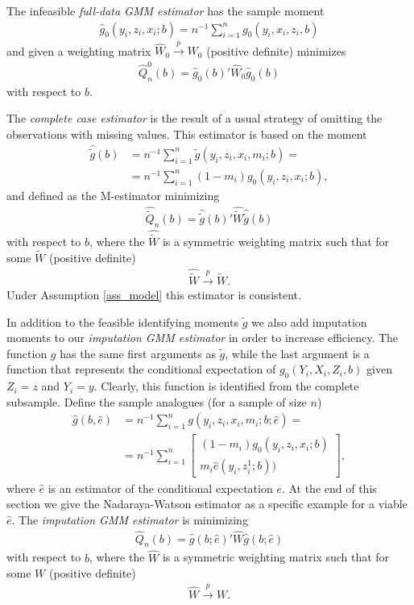\documentclass{article}
\theoremstyle{definition}
\theoremstyle{remark}
\begin{document}
The infeasible \emph{full-data GMM estimator} has the sample moment
\begin{align}
\hat{g}_0(y_i,z_i,x_i;b) = n^{-1}\sum_{i=1}^n g_0(y_i,x_i,z_i,b)
\end{align}
and given a weighting matrix $\hat{W}_0\stackrel{p}{\rightarrow} W_0$ (positive definite) minimizes
\begin{align}
\hat{Q}^0_n(b)= \hat{g}_0(b)'\hat{W}_0\hat{g}_0(b)
\end{align}
with respect to $b$.

The \textit{complete case estimator} is the result of a usual strategy of omitting the observations with missing values. This estimator is based on the moment
\begin{align}
\hat{\tilde{g}}(b)&=n^{-1}\sum_{i=1}^n \tilde{g}(y_i,z_i,x_i, m_i; b)= \\
&=n^{-1}\sum_{i=1}^n
(1-m_i) g_0(y_i,z_i,x_i; b), \nonumber %
\end{align}
and defined as the M-estimator minimizing
\begin{align}
\hat{\tilde{Q}}_n(b)= \hat{\tilde{g}}(b)'\hat{\tilde{W}}\hat{\tilde{g}}(b)
\end{align}
with respect to $b$, where the $\hat{\tilde{W}}$ is a symmetric weighting matrix such that for some $\tilde{W}$ (positive definite)
\begin{align}
\hat{\tilde{W}} \stackrel{p}{\rightarrow}\tilde{W}.
\end{align}
Under Assumption \ref{ass_model} this estimator is consistent. 

In addition to the feasible identifying moments $\tilde{g}$ we also add imputation moments to our \emph{imputation GMM estimator} in order to increase efficiency. The function $g$ has the same first arguments as $\tilde{g}$, while the last argument is a function that represents the conditional expectation of $g_0(Y_i, X_i, Z_i, b)$ given $Z_i=z$ and $Y_i=y$. Clearly, this function is identified from the complete subsample. Define the sample analogues (for a sample of size $n$)
\begin{align}
    \hat{g}(b, \hat{e})&=n^{-1}\sum_{i=1}^n g(y_i,z_i,x_i,m_i; b; \hat{e})= \\
    &=n^{-1}\sum_{i=1}^n\left[\begin{array}{c}
        (1-m_i) g_0(y_i,z_i,x_i; b)  \\
         m_i \hat{e}(y_i, z_i^1; b))
    \end{array}\right], \nonumber
\end{align}
where $\hat{e}$ is an estimator of the conditional expectation $e$. At the end of this section we give the Nadaraya-Watson estimator as a specific example for a viable $\hat{e}$. The \textit{imputation GMM estimator} is minimizing
\begin{align}
    \hat{Q}_n(b)= \hat{g}(b;\hat{e})'\hat{W}\hat{g}(b;\hat{e})
\end{align}
with respect to $b$, where the $\hat{W}$ is a symmetric weighting matrix such that for some $W$ (positive definite)
\begin{align}
    \hat{W} \stackrel{p}{\rightarrow}W.
\end{align}
\end{document}
